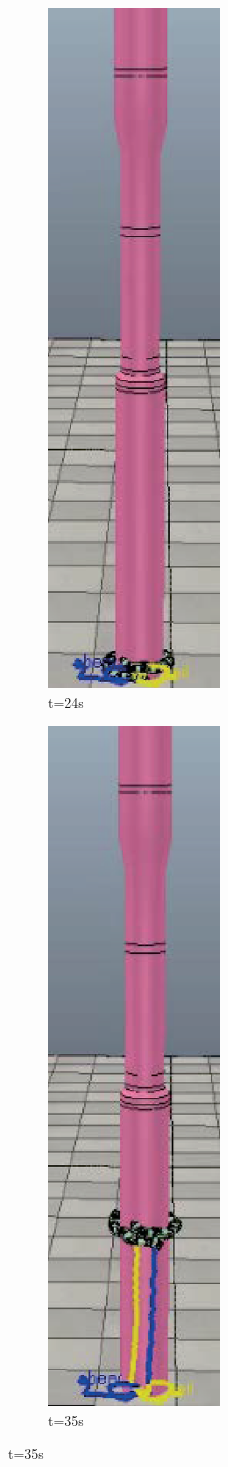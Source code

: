 \begin{figure}[htbp]
\begin{subfigure}{0.3\textwidth}{
			\centering
			\includegraphics[height=0.18\textheight,width=0.5\textwidth]{figure/chap05/BSB/34s.eps}
			\caption{t=24s}
		}
	\end{subfigure}
	\begin{subfigure}{0.3\textwidth}{
			\centering
			\includegraphics[height=0.18\textheight,width=0.5\textwidth]{figure/chap05/BSB/49s.eps}
			\caption{t=35s}
		}
	\end{subfigure}

\end{figure}
